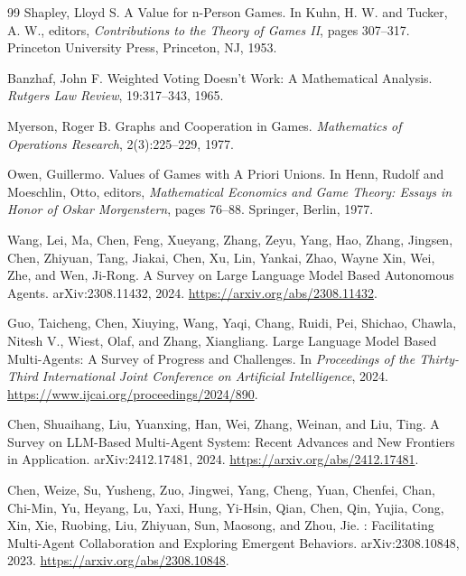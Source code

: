\begin{thebibliography}{99}
Shapley, Lloyd S.
\newblock A Value for n-Person Games.
\newblock In Kuhn, H. W. and Tucker, A. W., editors, \emph{Contributions to the Theory of Games II}, pages 307--317. Princeton University Press, Princeton, NJ, 1953.

Banzhaf, John F.
\newblock Weighted Voting Doesn't Work: A Mathematical Analysis.
\newblock \emph{Rutgers Law Review}, 19:317--343, 1965.

Myerson, Roger B.
\newblock Graphs and Cooperation in Games.
\newblock \emph{Mathematics of Operations Research}, 2(3):225--229, 1977.

Owen, Guillermo.
\newblock Values of Games with A Priori Unions.
\newblock In Henn, Rudolf and Moeschlin, Otto, editors, \emph{Mathematical Economics and Game Theory: Essays in Honor of Oskar Morgenstern}, pages 76--88. Springer, Berlin, 1977.

Wang, Lei, Ma, Chen, Feng, Xueyang, Zhang, Zeyu, Yang, Hao, Zhang, Jingsen, Chen, Zhiyuan, Tang, Jiakai, Chen, Xu, Lin, Yankai, Zhao, Wayne Xin, Wei, Zhe, and Wen, Ji-Rong.
\newblock A Survey on Large Language Model Based Autonomous Agents.
\newblock arXiv:2308.11432, 2024.
\newblock \url{https://arxiv.org/abs/2308.11432}.

Guo, Taicheng, Chen, Xiuying, Wang, Yaqi, Chang, Ruidi, Pei, Shichao, Chawla, Nitesh V., Wiest, Olaf, and Zhang, Xiangliang.
\newblock Large Language Model Based Multi-Agents: A Survey of Progress and Challenges.
\newblock In \emph{Proceedings of the Thirty-Third International Joint Conference on Artificial Intelligence}, 2024.
\newblock \url{https://www.ijcai.org/proceedings/2024/890}.

Chen, Shuaihang, Liu, Yuanxing, Han, Wei, Zhang, Weinan, and Liu, Ting.
\newblock A Survey on LLM-Based Multi-Agent System: Recent Advances and New Frontiers in Application.
\newblock arXiv:2412.17481, 2024.
\newblock \url{https://arxiv.org/abs/2412.17481}.

Chen, Weize, Su, Yusheng, Zuo, Jingwei, Yang, Cheng, Yuan, Chenfei, Chan, Chi-Min, Yu, Heyang, Lu, Yaxi, Hung, Yi-Hsin, Qian, Chen, Qin, Yujia, Cong, Xin, Xie, Ruobing, Liu, Zhiyuan, Sun, Maosong, and Zhou, Jie.
: Facilitating Multi-Agent Collaboration and Exploring Emergent Behaviors.
\newblock arXiv:2308.10848, 2023.
\newblock \url{https://arxiv.org/abs/2308.10848}.


\end{thebibliography}
